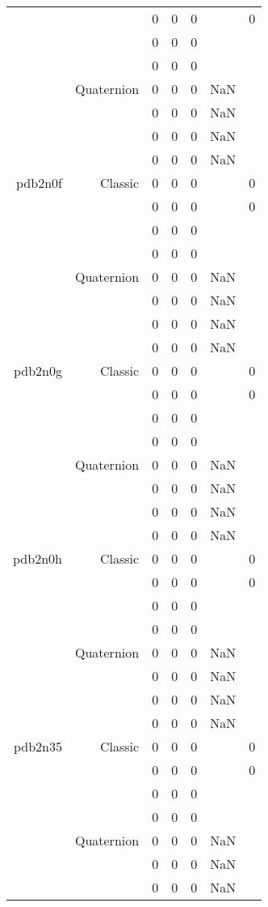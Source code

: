 \begin{xltabular}{\textwidth}{r|rcccSc}
& & 0 & 0 & 0 & & 0 \\
& & 0 & 0 & 0 & & \\
& & 0 & 0 & 0 & & \\
& Quaternion & 0 & 0 & 0 & NaN & \\
& & 0 & 0 & 0 & NaN & \\
& & 0 & 0 & 0 & NaN & \\
& & 0 & 0 & 0 & NaN & \\ \addlinespace
pdb2n0f & Classic & 0 & 0 & 0 & & 0 \\
& & 0 & 0 & 0 & & 0 \\
& & 0 & 0 & 0 & & \\
& & 0 & 0 & 0 & & \\
& Quaternion & 0 & 0 & 0 & NaN & \\
& & 0 & 0 & 0 & NaN & \\
& & 0 & 0 & 0 & NaN & \\
& & 0 & 0 & 0 & NaN & \\ \addlinespace
pdb2n0g & Classic & 0 & 0 & 0 & & 0 \\
& & 0 & 0 & 0 & & 0 \\
& & 0 & 0 & 0 & & \\
& & 0 & 0 & 0 & & \\
& Quaternion & 0 & 0 & 0 & NaN & \\
& & 0 & 0 & 0 & NaN & \\
& & 0 & 0 & 0 & NaN & \\
& & 0 & 0 & 0 & NaN & \\ \addlinespace
pdb2n0h & Classic & 0 & 0 & 0 & & 0 \\
& & 0 & 0 & 0 & & 0 \\
& & 0 & 0 & 0 & & \\
& & 0 & 0 & 0 & & \\
& Quaternion & 0 & 0 & 0 & NaN & \\
& & 0 & 0 & 0 & NaN & \\
& & 0 & 0 & 0 & NaN & \\
& & 0 & 0 & 0 & NaN & \\ \addlinespace
pdb2n35 & Classic & 0 & 0 & 0 & & 0 \\
& & 0 & 0 & 0 & & 0 \\
& & 0 & 0 & 0 & & \\
& & 0 & 0 & 0 & & \\
& Quaternion & 0 & 0 & 0 & NaN & \\
& & 0 & 0 & 0 & NaN & \\
& & 0 & 0 & 0 & NaN & \\

\end{xltabular}

